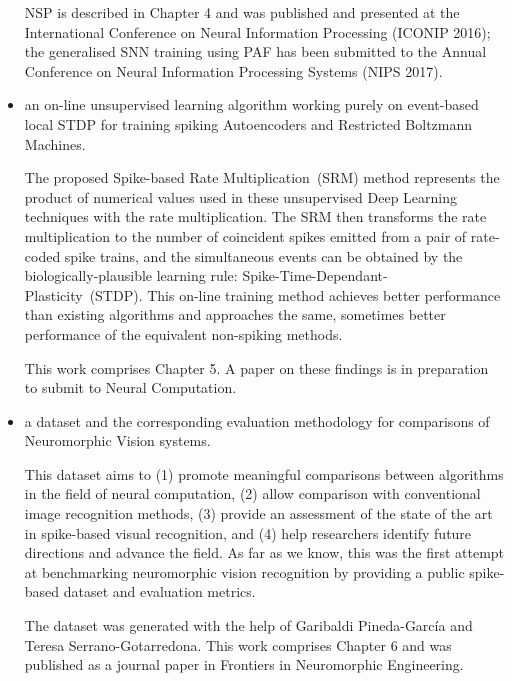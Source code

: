 \begin{itemize}
	NSP is described in Chapter 4 and was published and presented at the International Conference on Neural Information Processing (ICONIP 2016);
	the generalised SNN training using PAF has been submitted to the Annual Conference on Neural Information Processing Systems (NIPS 2017).

	\item 
	an on-line unsupervised learning algorithm working purely on event-based local STDP for training spiking Autoencoders and Restricted Boltzmann Machines.
	
	The proposed Spike-based Rate Multiplication~(SRM) method represents the product of numerical values used in these unsupervised Deep Learning techniques with the rate multiplication.
	The SRM then transforms the rate multiplication to the number of coincident spikes emitted from a pair of rate-coded spike trains, and the simultaneous events can be obtained by the biologically-plausible learning rule: Spike-Time-Dependant-Plasticity~(STDP).
	This on-line training method achieves better performance than existing algorithms and approaches the same, sometimes better performance of the equivalent non-spiking methods.
%	
	
	This work comprises Chapter 5.
	A paper on these findings is in preparation to submit to Neural Computation.
	
	\item 
	a dataset and the corresponding evaluation methodology for comparisons of Neuromorphic Vision systems.
	
	This dataset aims to (1) promote meaningful comparisons between algorithms in the field of neural computation, (2) allow comparison with conventional image recognition methods, (3) provide an assessment of the state of the art in spike-based visual recognition, and (4) help researchers identify future directions and advance the field.
	As far as we know, this was the first attempt at benchmarking neuromorphic vision recognition by providing a public spike-based dataset and evaluation metrics.
	
	The dataset was generated with the help of Garibaldi Pineda-Garc\'ia and Teresa Serrano-Gotarredona.
	This work comprises Chapter 6 and was published as a journal paper in Frontiers in Neuromorphic Engineering.
\end{itemize}

